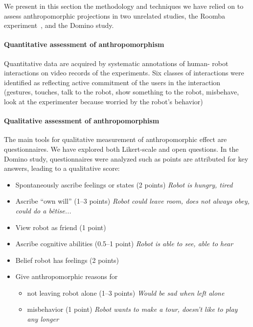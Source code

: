 \documentclass{frontiersSCNS} %
\begin{document}
We present in this section the methodology and techniques we have relied on to
assess anthropomorphic projections in two unrelated studies, the Roomba
experiment~\cite{fink_living_2013}, and the Domino study.

\paragraph{Quantitative assessment of anthropomorphism} Quantitative data are
acquired by systematic annotations of human- robot interactions on video records
of the experiments. Six classes of interactions were identified as reflecting
active commitment of the users in the interaction (gestures, touches, talk to
the robot, show something to the robot, misbehave, look at the experimenter
because worried by the robot's behavior)

\paragraph{Qualitative assessment of anthropomorphism} The main tools for
qualitative measurement of anthropomorphic effect are questionnaires. We have
explored both Likert-scale and open questions. In the Domino study,
questionnaires were analyzed such as points are attributed for key answers,
leading to a qualitative score:

\begin{itemize}
    \item Spontaneously ascribe feelings or states (2 points) {\it Robot is
        hungry, tired}
    \item Ascribe ``own will'' (1--3 points) {\it Robot could leave room, does not
        always obey, could do a b\^{e}tise...}
    \item View robot as friend (1 point)
    \item Ascribe cognitive abilities (0.5--1 point) {\it Robot is able to see,
        able to hear}
    \item Belief robot has feelings (2 points)
    \item Give anthropomorphic reasons for
        \begin{itemize}
            \item not leaving robot alone (1--3 points) {\it Would be sad when
                left alone}
            \item misbehavior (1 point) {\it Robot wants to make a tour, doesn't
                like to play any longer}
        \end{itemize}
\end{itemize}
\end{document}
